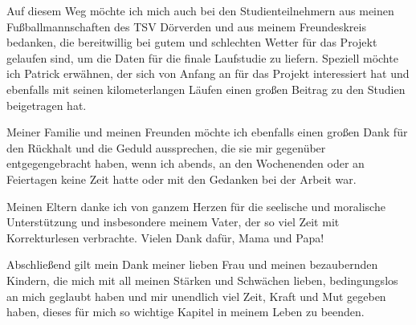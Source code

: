 Auf diesem Weg möchte ich mich auch bei den Studienteilnehmern aus meinen Fußballmannschaften des TSV Dörverden und aus meinem Freundeskreis bedanken, die bereitwillig bei gutem und schlechten Wetter für das Projekt gelaufen sind, um die Daten für die finale Laufstudie zu liefern. Speziell möchte ich Patrick erwähnen, der sich von Anfang an für das Projekt interessiert hat und ebenfalls mit seinen kilometerlangen Läufen einen großen Beitrag zu den Studien beigetragen hat.

Meiner Familie und meinen Freunden möchte ich ebenfalls einen großen Dank für den Rückhalt und die Geduld aussprechen, die sie mir gegenüber entgegengebracht haben, wenn ich abends, an den Wochenenden oder an Feiertagen keine Zeit hatte oder mit den Gedanken bei der Arbeit war. 

Meinen Eltern danke ich von ganzem Herzen für die seelische und moralische Unterstützung und insbesondere meinem Vater, der so viel Zeit mit Korrekturlesen verbrachte. Vielen Dank dafür, Mama und Papa! 

Abschließend gilt mein Dank meiner lieben Frau und meinen bezaubernden Kindern, die mich mit all meinen Stärken und Schwächen lieben, bedingungslos an mich geglaubt haben und mir unendlich viel Zeit, Kraft und Mut gegeben haben, dieses für mich so wichtige Kapitel in meinem Leben zu beenden. 